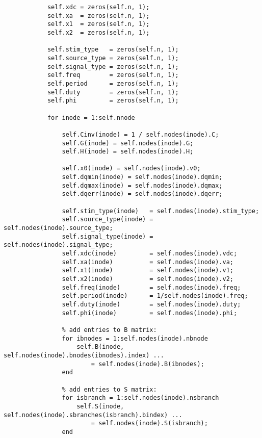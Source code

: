 \begin{lstlisting}
            self.xdc = zeros(self.n, 1);
            self.xa  = zeros(self.n, 1);
            self.x1  = zeros(self.n, 1);
            self.x2  = zeros(self.n, 1);

            self.stim_type   = zeros(self.n, 1);
            self.source_type = zeros(self.n, 1);
            self.signal_type = zeros(self.n, 1);
            self.freq        = zeros(self.n, 1);
            self.period      = zeros(self.n, 1);
            self.duty        = zeros(self.n, 1);
            self.phi         = zeros(self.n, 1);

            for inode = 1:self.nnode
                
                self.Cinv(inode) = 1 / self.nodes(inode).C;
                self.G(inode) = self.nodes(inode).G;
                self.H(inode) = self.nodes(inode).H; 
                
                self.x0(inode) = self.nodes(inode).v0;
                self.dqmin(inode) = self.nodes(inode).dqmin;
                self.dqmax(inode) = self.nodes(inode).dqmax;
                self.dqerr(inode) = self.nodes(inode).dqerr;
                
                self.stim_type(inode)   = self.nodes(inode).stim_type;
                self.source_type(inode) = self.nodes(inode).source_type;
                self.signal_type(inode) = self.nodes(inode).signal_type;
                self.xdc(inode)         = self.nodes(inode).vdc;
                self.xa(inode)          = self.nodes(inode).va;
                self.x1(inode)          = self.nodes(inode).v1;
                self.x2(inode)          = self.nodes(inode).v2;
                self.freq(inode)        = self.nodes(inode).freq;
                self.period(inode)      = 1/self.nodes(inode).freq;
                self.duty(inode)        = self.nodes(inode).duty;
                self.phi(inode)         = self.nodes(inode).phi;
                
                % add entries to B matrix:
                for ibnodes = 1:self.nodes(inode).nbnode
                    self.B(inode, self.nodes(inode).bnodes(ibnodes).index) ...
                        = self.nodes(inode).B(ibnodes);
                end
                
                % add entries to S matrix:
                for isbranch = 1:self.nodes(inode).nsbranch
                    self.S(inode, self.nodes(inode).sbranches(isbranch).bindex) ...
                        = self.nodes(inode).S(isbranch);
                end


\end{lstlisting}
